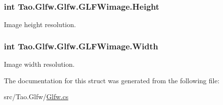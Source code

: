 \hypertarget{struct_tao_1_1_glfw_1_1_glfw_1_1_g_l_f_wimage_abf6904ce3e9f1f31721da07236dcec6e}{
\subsubsection[{Height}]{\setlength{\rightskip}{0pt plus 5cm}int {\bf Tao.Glfw.Glfw.GLFWimage.Height}}}
\label{struct_tao_1_1_glfw_1_1_glfw_1_1_g_l_f_wimage_abf6904ce3e9f1f31721da07236dcec6e}


Image height resolution. 

\hypertarget{struct_tao_1_1_glfw_1_1_glfw_1_1_g_l_f_wimage_a5ed4915bbdf50bcb89675323995db1ba}{
\subsubsection[{Width}]{\setlength{\rightskip}{0pt plus 5cm}int {\bf Tao.Glfw.Glfw.GLFWimage.Width}}}
\label{struct_tao_1_1_glfw_1_1_glfw_1_1_g_l_f_wimage_a5ed4915bbdf50bcb89675323995db1ba}


Image width resolution. 



The documentation for this struct was generated from the following file:\begin{DoxyCompactItemize}
\item 
src/Tao.Glfw/\hyperlink{_glfw_8cs}{Glfw.cs}\end{DoxyCompactItemize}
